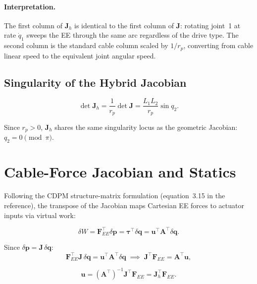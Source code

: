 \documentclass[12pt, a4paper]{article}
\theoremstyle{definition}
\newcommand{\bq}{\bm{q}}
\newcommand{\bp}{\bm{p}}
\newcommand{\bu}{\bm{u}}
\newcommand{\btau}{\bm{\tau}}
\newcommand{\bF}{\bm{F}}
\newcommand{\bJ}{\bm{J}}
\newcommand{\bA}{\bm{A}}
\begin{document}
\paragraph{Interpretation.}
The first column of $\bJ_h$ is identical to the first column of $\bJ$: rotating
joint~1 at rate $\dot{q}_1$ sweeps the EE through the same arc regardless of the
drive type.  The second column is the standard cable column scaled by $1/r_p$,
converting from cable linear speed to the equivalent joint angular speed.

\subsection{Singularity of the Hybrid Jacobian}
\label{sec:sing}

\begin{equation}
  \det \bJ_h = \frac{1}{r_p}\det\bJ = \frac{L_1 L_2}{r_p}\sin q_2 .
\end{equation}

Since $r_p > 0$, $\bJ_h$ shares the same singularity locus as the geometric
Jacobian: $q_2 = 0\pmod{\pi}$.

\section{Cable-Force Jacobian and Statics}
\label{sec:cable_force_jac}

Following the CDPM structure-matrix formulation (equation~3.15 in the reference),
the transpose of the Jacobian maps Cartesian EE forces to actuator inputs via
virtual work:

\begin{equation}
  \delta W
  = \bF_{EE}^\top \delta\bp
  = \btau^\top \delta\bq
  = \bu^\top \bA^\top \delta\bq .
\end{equation}

Since $\delta\bp = \bJ\,\delta\bq$:
\begin{equation}
  \bF_{EE}^\top \bJ\,\delta\bq
  = \bu^\top \bA^\top \delta\bq
  \;\implies\;
  \bJ^\top \bF_{EE} = \bA^\top \bu,
\end{equation}

\begin{equation}
  \label{eq:force_map}
  \bu = (\bA^\top)^{-1} \bJ^\top \bF_{EE}
      = \bJ_h^\top \bF_{EE}.
\end{equation}
\end{document}
